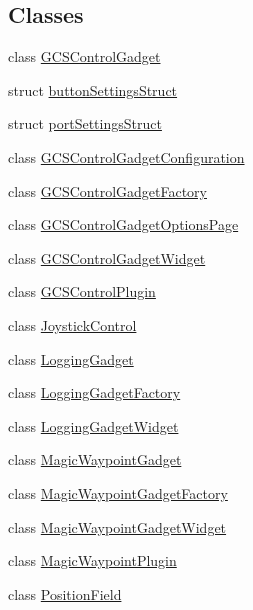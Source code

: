\subsection*{Classes}
\begin{DoxyCompactItemize}
\item 
class \hyperlink{class_g_c_s_control_gadget}{G\-C\-S\-Control\-Gadget}
\item 
struct \hyperlink{structbutton_settings_struct}{button\-Settings\-Struct}
\item 
struct \hyperlink{structport_settings_struct}{port\-Settings\-Struct}
\item 
class \hyperlink{class_g_c_s_control_gadget_configuration}{G\-C\-S\-Control\-Gadget\-Configuration}
\item 
class \hyperlink{class_g_c_s_control_gadget_factory}{G\-C\-S\-Control\-Gadget\-Factory}
\item 
class \hyperlink{class_g_c_s_control_gadget_options_page}{G\-C\-S\-Control\-Gadget\-Options\-Page}
\item 
class \hyperlink{class_g_c_s_control_gadget_widget}{G\-C\-S\-Control\-Gadget\-Widget}
\item 
class \hyperlink{class_g_c_s_control_plugin}{G\-C\-S\-Control\-Plugin}
\item 
class \hyperlink{class_joystick_control}{Joystick\-Control}
\item 
class \hyperlink{class_logging_gadget}{Logging\-Gadget}
\item 
class \hyperlink{class_logging_gadget_factory}{Logging\-Gadget\-Factory}
\item 
class \hyperlink{class_logging_gadget_widget}{Logging\-Gadget\-Widget}
\item 
class \hyperlink{class_magic_waypoint_gadget}{Magic\-Waypoint\-Gadget}
\item 
class \hyperlink{class_magic_waypoint_gadget_factory}{Magic\-Waypoint\-Gadget\-Factory}
\item 
class \hyperlink{class_magic_waypoint_gadget_widget}{Magic\-Waypoint\-Gadget\-Widget}
\item 
class \hyperlink{class_magic_waypoint_plugin}{Magic\-Waypoint\-Plugin}
\item 
class \hyperlink{class_position_field}{Position\-Field}
\end{DoxyCompactItemize}
